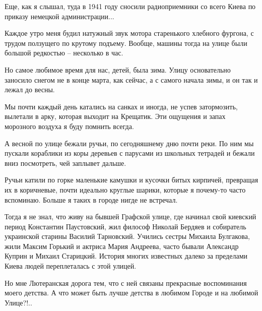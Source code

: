 Еще, как я слышал, туда в 1941 году сносили радиоприемники со всего Киева по
приказу немецкой администрации...

Каждое утро меня будил натужный звук мотора старенького хлебного фургона, с
трудом ползущего по крутому подъему. Вообще, машины тогда на улице были большой
редкостью – несколько в час.

Но самое любимое время для нас, детей, была зима. Улицу основательно заносило
снегом не в конце марта, как сейчас, а с самого начала зимы, и он так и лежал
до весны.


Мы почти каждый день катались на санках и иногда, не успев затормозить,
вылетали в арку, которая выходит на Крещатик. Эти ощущения и запах морозного
воздуха я буду помнить всегда.

А весной по улице бежали ручьи, по сегодняшнему дню почти реки. По ним мы
пускали кораблики из коры деревьев с парусами из школьных тетрадей и бежали
вниз посмотреть, чей заплывет дальше.

Ручьи катили по горке маленькие камушки и кусочки битых кирпичей, превращая их
в коричневые, почти идеально круглые шарики, которые я почему-то часто
вспоминаю. Больше я таких в городе нигде не встречал.

Тогда я не знал, что живу на бывшей Графской улице, где начинал свой киевский
период Константин Паустовский, жил философ Николай Бердяев и собиратель
украинской старины Василий Тарновский. Учились сестры Михаила Булгакова, жили
Максим Горький и актриса Мария Андреева, часто бывали Александр Куприн и Михаил
Старицкий. История многих известных далеко за пределами Киева людей
переплеталась с этой улицей.

Но мне Лютеранская дорога тем, что с ней связаны прекрасные воспоминания моего
детства. А что может быть лучше детства в любимом Городе и на любимой Улице?!..
